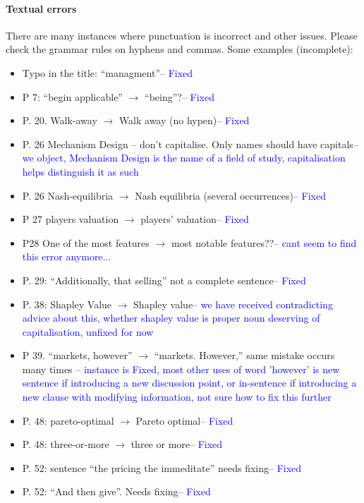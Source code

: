 \documentclass{article}
\begin{document}
\paragraph{Textual errors}
There are many instances where punctuation is incorrect and other issues. Please check the
grammar rules on hyphens and commas. Some examples (incomplete):
\begin{itemize}
\item	Typo in the title: “managment”\textcolor{blue}{-- Fixed}
\item	P 7: “begin applicable” $\rightarrow$ “being”?\textcolor{blue}{-- Fixed}
\item	P. 20. Walk-away $\rightarrow$ Walk away (no hypen)\textcolor{blue}{-- Fixed}
\item	P. 26 Mechanism Design – don’t capitalise. Only names should have capitals\textcolor{blue}{-- we object, Mechanism Design is the name of a field of study, capitalisation helps distinguish it as such}
\item	P. 26 Nash-equilibria $\rightarrow$ Nash equilibria (several occurrences)\textcolor{blue}{-- Fixed}
\item	P 27 players valuation $\rightarrow$ players’ valuation\textcolor{blue}{-- Fixed}
\item	P28 One of the most features $\rightarrow$ most notable features??\textcolor{blue}{-- cant seem to find this error anymore...}
\item	P. 29: “Additionally, that selling” not a complete sentence\textcolor{blue}{-- Fixed}
\item	P. 38: Shapley Value $\rightarrow$ Shapley value\textcolor{blue}{-- we have received contradicting advice about this, whether shapley value is proper noun deserving of capitalisation, unfixed for now}
\item	P 39. “markets, however” $\rightarrow$ “markets. However,” same mistake occurs many times \textcolor{blue}{-- instance is Fixed, most other uses of word 'however' is new sentence if introducing a new discussion point, or in-sentence if introducing a new clause with modifying information, not sure how to fix this further}
\item	P. 48: pareto-optimal $\rightarrow$ Pareto optimal\textcolor{blue}{-- Fixed}
\item	P. 48: three-or-more $\rightarrow$ three or more\textcolor{blue}{-- Fixed}
\item	P. 52: sentence “the pricing the immeditate” needs fixing\textcolor{blue}{-- Fixed}
\item	P. 52: “And then give”. Needs fixing\textcolor{blue}{-- Fixed}

\end{itemize}
\end{document}
